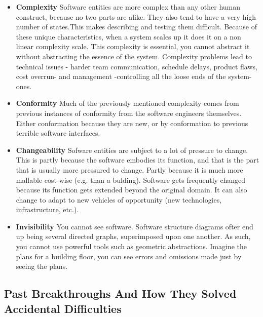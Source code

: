 \documentclass[letterpaper,12pt,parskip=full]{article}
\begin{document}
\begin{itemize}
    \item \textbf{Complexity} Software entities are more complex than any other human construct, because no two parts are alike. They also tend to have a very high number of states.This makes describing and testing them difficult. Because of these unique characteristics, when a system scales up it does it on a non linear complexity scale. This complexity is essential, you cannot abstract it without abstracting the essence of the system. Complexity problems lead to technical issues - harder team communication, schedule delays, product flaws, cost overrun- and management -controlling all the loose ends of the system- ones.
    \item \textbf{Conformity} Much of the previously mentioned complexity comes from previous instances of conformity from the software engineers themselves. Either conformation because they are new, or by conformation to previous terrible software interfaces.
    \item \textbf{Changeability} Sofware entities are subject to a lot of pressure to change. This is partly because the software embodies its function, and that is the part that is usually more pressured to change. Partly because it is much more mallable cost-wise (e.g. than a bulding). Software gets frequently changed because its function gets extended beyond the original domain. It can also change to adapt to new vehicles of opportunity (new technologies, infrastructure, etc.).
    \item \textbf{Invisibility} You cannot see software. Software structure diagrams ofter end up being several directed graphs, superimposed upon one another. As such, you cannot use powerful tools such as geometric abstractions. Imagine the plans for a building floor, you can see errors and omissions made just by seeing the plans. 
\end{itemize}

\subsection{Past Breakthroughs And How They Solved Accidental Difficulties}
\end{document}
